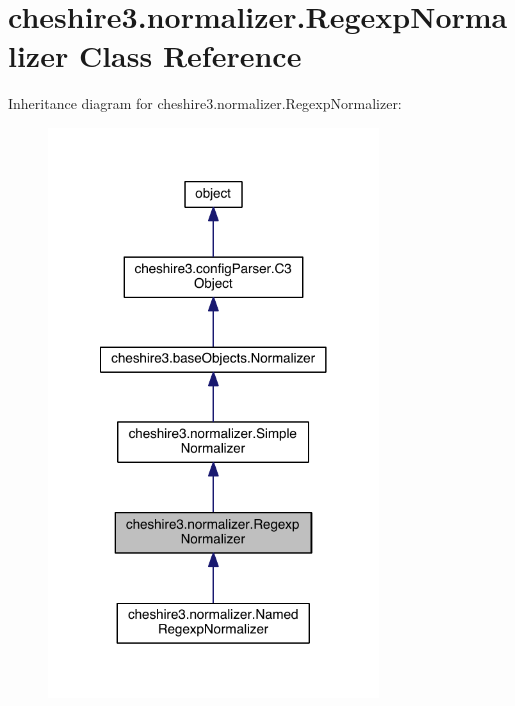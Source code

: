 \hypertarget{classcheshire3_1_1normalizer_1_1_regexp_normalizer}{\section{cheshire3.\-normalizer.\-Regexp\-Normalizer Class Reference}
\label{classcheshire3_1_1normalizer_1_1_regexp_normalizer}
}


Inheritance diagram for cheshire3.\-normalizer.\-Regexp\-Normalizer\-:
\nopagebreak
\begin{figure}[H]
\begin{center}
\leavevmode
\includegraphics[width=248pt]{classcheshire3_1_1normalizer_1_1_regexp_normalizer__inherit__graph}
\end{center}
\end{figure}


